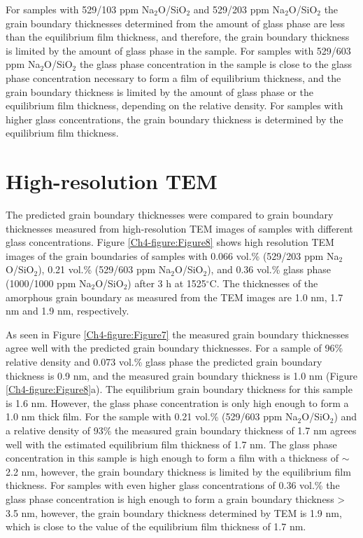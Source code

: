 For samples with 529/103 ppm Na$_{2}$O/SiO$_{2}$ and 529/203 ppm Na$_{2}$O/SiO$_{2}$ the grain boundary thicknesses determined from the amount of glass phase are less than the equilibrium film thickness, and therefore, the grain boundary thickness is limited by the amount of glass phase in the sample. For samples with 529/603 ppm Na$_{2}$O/SiO$_{2}$ the glass phase concentration in the sample is close to the glass phase concentration necessary to form a film of equilibrium thickness, and the grain boundary thickness is limited by the amount of glass phase or the equilibrium film thickness, depending on the relative density. For samples with higher glass concentrations, the grain boundary thickness is determined by the equilibrium film thickness. 

\section{High-resolution TEM}
The predicted grain boundary thicknesses were compared to grain boundary thicknesses measured from high-resolution TEM images of samples with different glass concentrations. Figure \ref{Ch4-figure:Figure8} shows high resolution TEM images of the grain boundaries of samples with 0.066 vol.\% (529/203 ppm Na$_{2}$O/SiO$_{2}$), 0.21 vol.\% (529/603 ppm Na$_{2}$O/SiO$_{2}$), and 0.36 vol.\% glass phase (1000/1000 ppm Na$_{2}$O/SiO$_{2}$) after 3 h at 1525$^{\circ}$C. The thicknesses of the amorphous grain boundary as measured from the TEM images are 1.0 nm, 1.7 nm and 1.9 nm, respectively. 

As seen in Figure \ref{Ch4-figure:Figure7} the measured grain boundary thicknesses agree well with the predicted grain boundary thicknesses. For a sample of 96\% relative density and 0.073 vol.\% glass phase the predicted grain boundary thickness is 0.9 nm, and the measured grain boundary thickness is 1.0 nm (Figure \ref{Ch4-figure:Figure8}a). The equilibrium grain boundary thickness for this sample is 1.6 nm. However, the glass phase concentration is only high enough to form a 1.0 nm thick film. For the sample with 0.21 vol.\% (529/603 ppm Na$_{2}$O/SiO$_{2}$) and a relative density of 93\% the measured grain boundary thickness of 1.7 nm agrees well with the estimated equilibrium film thickness of 1.7 nm. The glass phase concentration in this sample is high enough to form a film with a thickness of $\sim$2.2 nm, however, the grain boundary thickness is limited by the equilibrium film thickness. For samples with even higher glass concentrations of 0.36 vol.\% the glass phase concentration is high enough to form a grain boundary thickness > 3.5 nm, however, the grain boundary thickness determined by TEM is 1.9 nm, which is close to the value of the equilibrium film thickness of 1.7 nm.


